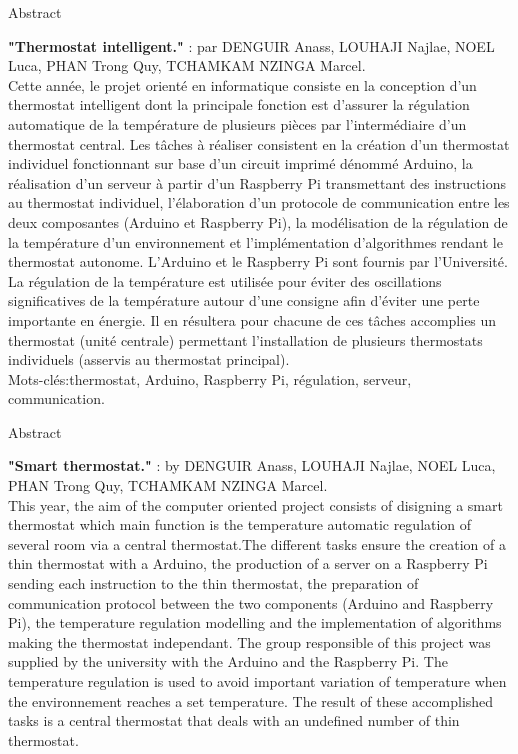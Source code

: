 \documentclass[12pt]{report}
\begin{document}
\newpage
\begin{center}
\large Abstract
\end{center}
\small \textbf{"Thermostat intelligent."} : par DENGUIR Anass, LOUHAJI Najlae, NOEL Luca, PHAN Trong Quy, TCHAMKAM NZINGA Marcel.\\
\newline
Cette ann\'{e}e, le projet orient\'{e} en informatique consiste en la conception d’un thermostat intelligent dont la principale fonction est d'assurer la régulation automatique de la température de plusieurs pièces par l’intermédiaire d’un thermostat central. Les tâches à réaliser consistent en la création d'un thermostat individuel fonctionnant sur base d'un circuit imprimé dénommé Arduino, la réalisation d'un serveur à partir d’un Raspberry Pi transmettant des instructions au thermostat individuel, l'élaboration  d’un protocole de communication entre les deux composantes (Arduino et Raspberry Pi), la modélisation de la régulation de la température d'un environnement et l’implémentation d’algorithmes rendant le thermostat autonome. L'Arduino et le Raspberry Pi sont fournis par l’Université. La régulation de la température est utilisée pour éviter des oscillations significatives de la température autour d’une consigne afin d'éviter une perte importante en énergie. Il en résultera pour chacune de ces tâches accomplies un thermostat (unité centrale) permettant l'installation de plusieurs thermostats individuels (asservis au thermostat principal).\\

Mots-clés:thermostat, Arduino, Raspberry Pi, régulation, serveur, communication.
\vspace{1.0cm}


\begin{center}
\large Abstract
\end{center}
\small \textbf{"Smart thermostat."} : by DENGUIR Anass, LOUHAJI Najlae, NOEL Luca, PHAN Trong Quy, TCHAMKAM NZINGA Marcel.\\
\newline
This year, the aim of the computer oriented project consists of disigning a smart thermostat which main function is the temperature automatic regulation of several room via a central thermostat.The different tasks ensure the creation of a thin thermostat with a Arduino, the production of a server on a Raspberry Pi sending each instruction to the thin thermostat, the preparation of  communication protocol between the two components (Arduino and Raspberry Pi), the temperature regulation modelling and the implementation of algorithms making the thermostat independant. The group responsible of this project was supplied by the university with the Arduino and the Raspberry Pi. The temperature regulation is used to avoid important variation of temperature when the environnement reaches a set temperature. The result of these accomplished tasks is a central thermostat that deals with an undefined number of thin thermostat.\\
\end{document}
